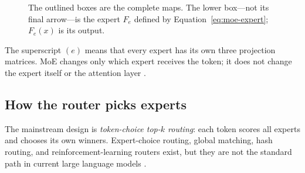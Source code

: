 \documentclass[11pt]{article}
\newcommand{\SiLU}{\operatorname{SiLU}}
\begin{document}
\begin{figure}[H]
{%
  }
  \caption{The outlined boxes are the complete maps.  The lower box---not its
  final arrow---is the expert $F_e$ defined by
  Equation~\eqref{eq:moe-expert}; $F_e(x)$ is its output.}
  \label{fig:swiglu-expert}
\end{figure}

The superscript $(e)$ means that every expert has its own three projection
matrices.  MoE changes only which expert receives the token; it does not change
the expert itself or the attention layer
\citep{shazeer2020glu,lepikhin2020gshard}.

\subsection{How the router picks experts}

The mainstream design is \emph{token-choice top-$k$ routing}: each token scores
all experts and chooses its own winners.  Expert-choice routing, global matching,
hash routing, and reinforcement-learning routers exist, but they are not the
standard path in current large language models
\citep{hashimoto2026attentionmoe}.
\end{document}
